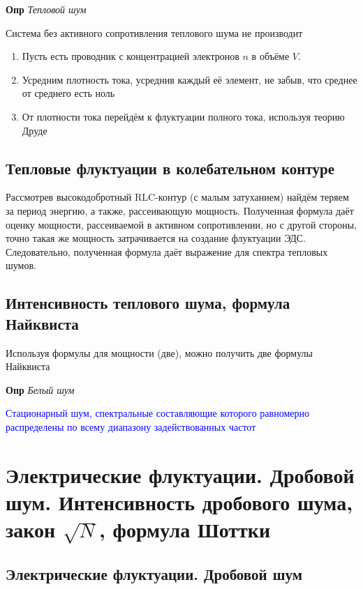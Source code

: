 \documentclass[a4paper, 14pt]{article}
\begin{document}
    \textbf{Опр} \textit{Тепловой шум}
    
    Система без активного сопротивления теплового шума не производит
    
    \begin{enumerate}
        \item Пусть есть проводник с концентрацией электронов $n$ в объёме $V$.
        \item Усредним плотность тока, усреднив каждый её элемент, не забыв, что среднее от среднего есть ноль
        \item От плотности тока перейдём к флуктуации полного тока, используя теорию Друде
    \end{enumerate}
    
    \subsection{Тепловые флуктуации в колебательном контуре}
    
    Рассмотрев высокодобротный RLC-контур (с малым затуханием) найдём теряем за период энергию, а также, рассеивающую
    мощность.
    Полученная формула даёт оценку мощности, рассеиваемой в активном сопротивлении, но с другой стороны, точно такая
    же мощность затрачивается на создание флуктуации ЭДС.
    Следовательно, полученная формула даёт выражение для спектра тепловых шумов.
    
    \subsection{Интенсивность теплового шума, формула Найквиста}
    
    Используя формулы для мощности (две), можно получить две формулы Найквиста
    
    \textbf{Опр} \textit{Белый шум}
    
    \textcolor{blue}{Стационарный шум, спектральные составляющие которого равномерно распределены по всему диапазону
    задействованных частот}
    
    \section{Электрические флуктуации. Дробовой шум.
    Интенсивность дробового шума, закон $\sqrt{N}$, формула Шоттки}
    
    \subsection{Электрические флуктуации. Дробовой шум}
    
\end{document}
